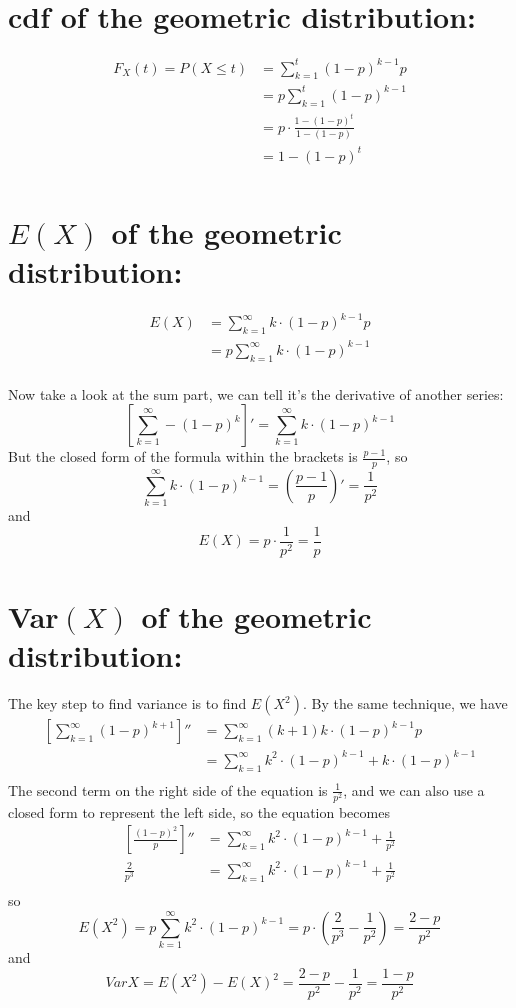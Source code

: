 \documentclass[11pt]{article}
\begin{document}
\section{\normalsize cdf of the geometric distribution:}
\[
\begin{aligned}
F_X(t) = P(X \leqslant t) 
	&= \sum _{k=1} ^t (1-p)^{k-1} p \\
	&= p \sum _{k=1} ^t (1-p)^{k-1} \\
	&= p \cdot \frac{1 - (1-p)^t}{1 - (1-p)} \\
	&= 1- (1-p)^t \\
\end{aligned}
\]



\section{\normalsize $E(X)$ of the geometric distribution:}
\[
\begin{aligned}
E(X) 
	&= \sum _{k=1} ^\infty k \cdot (1-p)^{k-1} p \\
	&= p \sum _{k=1} ^\infty k \cdot (1-p)^{k-1} \\
\end{aligned}
\]

Now take a look at the sum part,  we can tell it's the derivative of another series:
$$
\left[ \sum _{k=1} ^\infty - (1-p)^k \right] ' =  \sum _{k=1} ^\infty k \cdot (1-p)^{k-1}
$$
But the closed form of the formula within the brackets is $\displaystyle \frac{p-1}{p}$,  so
$$
 \sum _{k=1} ^\infty k \cdot (1-p)^{k-1} = \left( \frac{p-1}{p} \right)' = \frac{1}{p^2}
$$
and 
$$ E(X) = p \cdot \frac{1}{p^2} = \frac{1}{p} $$


\section{\normalsize Var$(X)$ of the geometric distribution: }

The key step to find variance is to find $E(X^2)$.  By the same technique,  we have
\[
\begin{aligned}
\left[ \sum _{k=1} ^\infty (1-p)^{k+1} \right]'' 
	&= \sum _{k=1} ^\infty (k+1)k \cdot (1-p)^{k-1} p \\
	&= \sum _{k=1} ^\infty k^2 \cdot (1-p)^{k-1} + k \cdot (1-p)^{k-1} \\
\end{aligned}
\]
The second term on the right side of the equation is $\displaystyle \frac{1}{p^2}$,  and we can also use a closed form to represent the left side,  so the  equation becomes
\[
\begin{aligned}
\left[ \frac{(1-p)^2}{p} \right]'' 
	&= \sum _{k=1} ^\infty k^2 \cdot (1-p)^{k-1} + \frac{1}{p^2} \\
\frac{2}{p^3}
	&= \sum _{k=1} ^\infty k^2 \cdot (1-p)^{k-1} + \frac{1}{p^2} \\
\end{aligned}
\]
so
\[
E(X^2) = p \sum _{k=1} ^\infty k^2 \cdot (1-p)^{k-1} = p \cdot \left( \frac{2}{p^3} - \frac{1}{p^2} \right) = \frac{2-p}{p^2} 
\]
and
\[
Var{X} = E(X^2) - E(X)^2 = \frac{2-p}{p^2}  - \frac{1}{p^2} = \frac{1-p}{p^2}
\]
\end{document}

